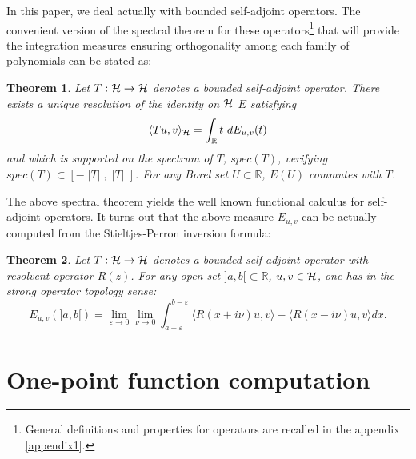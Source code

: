 \documentclass[a4paper]{jpconf}
\numberwithin{equation}{section}
\newtheorem{atheorem}{Theorem}
\theoremstyle{nonumberplain}
\begin{document}
In this paper, we deal actually with bounded self-adjoint operators. The convenient version of the spectral theorem for these operators{\footnote{General definitions and properties for operators are recalled in the appendix \ref{appendix1}.}} that will provide the integration measures ensuring orthogonality among each family of polynomials can be stated as:
\begin{atheorem}\label{orthop-1}
Let $T:{\cal{H}}\to{\cal{H}}$ denotes a bounded self-adjoint operator. There exists a unique resolution of the identity on ${\cal{H}} $ $E$ satisfying 
\begin{equation}
\langle Tu,v \rangle_{\cal{H}}=\int_{\mathbb{R}}t\ dE_{u,v}(t)\label{spectral-kinetic-operat}
\end{equation}
and which is supported on the spectrum of $T$, $spec(T)$, verifying $spec(T)\subset[-||T|| ,||T||]$. For any Borel set $U\subset\mathbb{R}$, $E(U)$ commutes with $T$.
\end{atheorem}
The above spectral theorem yields the well known functional calculus for self-adjoint operators. It turns out that the above measure $E_{u,v}$ can be actually computed from the Stieltjes-Perron inversion formula:
\begin{atheorem}\label{stieltjes-perron}
Let $T:{\cal{H}}\to{\cal{H}}$ denotes a bounded self-adjoint operator with resolvent operator $R(z)$. For any open set $]a,b[\subset\mathbb{R}$, $u,v\in\cal{H}$, one has in the strong operator topology sense:
\begin{equation}
E_{u,v}(]a,b[)=\lim_{\varepsilon\to0}\lim_{\nu\to0 }\int_{a+\varepsilon}^{b-\varepsilon}\langle R(x+i\nu)u,v \rangle-\langle R(x-i\nu)u,v \rangle dx.
\end{equation}
\end{atheorem}


\section{One-point function computation}\label{onepoint-comput}
\end{document}
